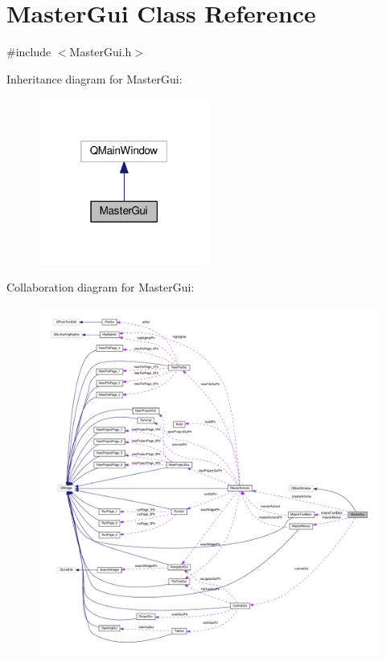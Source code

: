 \hypertarget{class_master_gui}{\section{Master\-Gui Class Reference}
\label{class_master_gui}
}


{\ttfamily \#include $<$Master\-Gui.\-h$>$}



Inheritance diagram for Master\-Gui\-:\nopagebreak
\begin{figure}[H]
\begin{center}
\leavevmode
\includegraphics[width=160pt]{class_master_gui__inherit__graph}
\end{center}
\end{figure}


Collaboration diagram for Master\-Gui\-:
\nopagebreak
\begin{figure}[H]
\begin{center}
\leavevmode
\includegraphics[width=350pt]{class_master_gui__coll__graph}
\end{center}
\end{figure}
